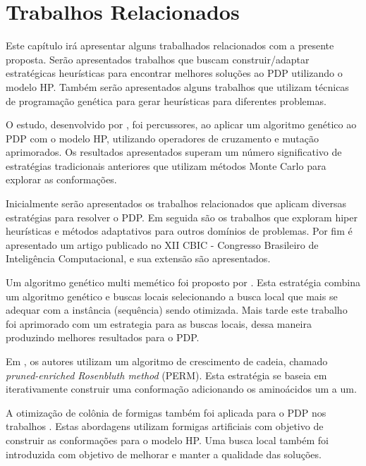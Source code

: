 \chapter{Trabalhos Relacionados}
\label{cap:Trabalhos Relacionados}

Este capítulo irá apresentar alguns trabalhados relacionados com a presente proposta. Serão apresentados trabalhos que buscam construir/adaptar estratégicas heurísticas para encontrar melhores soluções ao PDP utilizando o modelo HP. Também serão apresentados alguns trabalhos que utilizam técnicas de programação genética para gerar heurísticas para diferentes problemas.



O estudo, desenvolvido por \cite{unger1993genetic}, foi percussores, ao aplicar um algoritmo genético ao PDP com o modelo HP, utilizando operadores de cruzamento e mutação aprimorados. Os resultados apresentados superam um número significativo de estratégias tradicionais anteriores que utilizam métodos Monte Carlo para explorar as conformações.

Inicialmente serão apresentados os trabalhos relacionados que aplicam diversas estratégias para resolver o PDP. Em seguida são os trabalhos que exploram hiper heurísticas e métodos adaptativos para outros domínios de problemas. Por fim é apresentado um artigo \cite{fontouralimacbic2015} publicado no XII CBIC - Congresso Brasileiro de Inteligência Computacional, e sua extensão são apresentados.
 

Um algoritmo genético multi memético foi proposto por \cite{krasnogor2002multimeme}. Esta estratégia combina um algoritmo genético e buscas locais selecionando a busca local que mais se adequar com a instância (sequência) sendo otimizada. Mais tarde este trabalho foi aprimorado com um estrategia  para as buscas locais, dessa maneira produzindo melhores resultados para o PDP.

Em \cite{hsu2003growth}, os autores utilizam um algoritmo de crescimento de cadeia, chamado \textit{pruned-enriched Rosenbluth method} (PERM). Esta estratégia se baseia em iterativamente construir uma conformação adicionando os aminoácidos um a um. 

A otimização de colônia de formigas também foi aplicada para o PDP nos trabalhos \cite{shmygelska2002ant,shmygelska2003improved}. Estas abordagens utilizam formigas artificiais com objetivo de construir as conformações para o modelo HP. Uma busca local também foi introduzida com objetivo de melhorar e manter a qualidade das soluções. 

